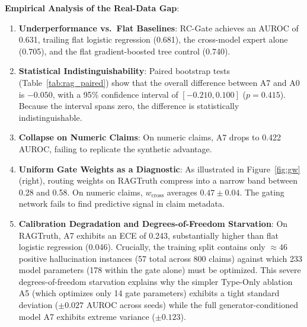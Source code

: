 \documentclass[pdflatex,sn-mathphys,Numbered]{sn-jnl}
\begin{document}
\noindent \textbf{Empirical Analysis of the Real-Data Gap}:
\begin{enumerate}
    \item \textbf{Underperformance vs.\ Flat Baselines}: RC-Gate achieves an AUROC of 0.631, trailing flat logistic regression (0.681), the cross-model expert alone (0.705), and the flat gradient-boosted tree control (0.740).
    \item \textbf{Statistical Indistinguishability}: Paired bootstrap tests (Table~\ref{tab:rag_paired}) show that the overall difference between A7 and A0 is $-0.050$, with a 95\% confidence interval of $[-0.210, 0.100]$ ($p = 0.415$). Because the interval spans zero, the difference is statistically indistinguishable.
    \item \textbf{Collapse on Numeric Claims}: On numeric claims, A7 drops to 0.422 AUROC, failing to replicate the synthetic advantage.
    \item \textbf{Uniform Gate Weights as a Diagnostic}: As illustrated in Figure~\ref{fig:gw} (right), routing weights on RAGTruth compress into a narrow band between 0.28 and 0.58. On numeric claims, $w_{\mathrm{cross}}$ averages $0.47 \pm 0.04$. The gating network fails to find predictive signal in claim metadata.
    \item \textbf{Calibration Degradation and Degrees-of-Freedom Starvation}: On RAGTruth, A7 exhibits an ECE of 0.243, substantially higher than flat logistic regression (0.046). Crucially, the training split contains only $\approx 46$ positive hallucination instances (57 total across 800 claims) against which 233 model parameters (178 within the gate alone) must be optimized. This severe degrees-of-freedom starvation explains why the simpler Type-Only ablation A5 (which optimizes only 14 gate parameters) exhibits a tight standard deviation ($\pm 0.027$ AUROC across seeds) while the full generator-conditioned model A7 exhibits extreme variance ($\pm 0.123$).
\end{enumerate}
\end{document}
